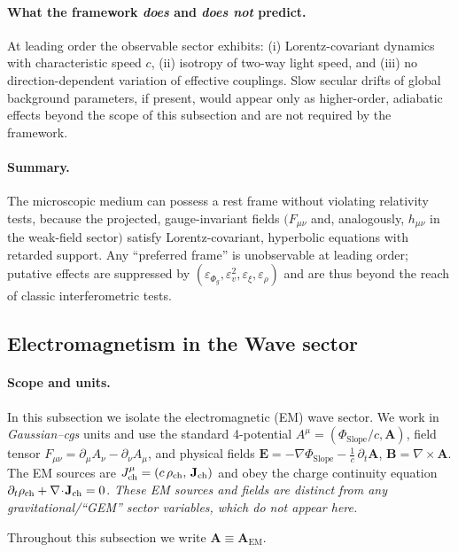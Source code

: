 \paragraph{What the framework \emph{does} and \emph{does not} predict.}
At leading order the observable sector exhibits: (i) Lorentz-covariant dynamics with characteristic speed $c$, (ii) isotropy of two-way light speed, and (iii) no direction-dependent variation of effective couplings. Slow secular drifts of global background parameters, if present, would appear only as higher-order, adiabatic effects beyond the scope of this subsection and are not required by the framework.

\paragraph{Summary.}
The microscopic medium can possess a rest frame without violating relativity tests, because the projected, gauge-invariant fields $(F_{\mu\nu}$ and, analogously, $h_{\mu\nu}$ in the weak-field sector$)$ satisfy Lorentz-covariant, hyperbolic equations with retarded support. Any ``preferred frame'' is unobservable at leading order; putative effects are suppressed by $(\varepsilon_{\Phi_g},\varepsilon_v^2,\varepsilon_\xi,\varepsilon_\rho)$ and are thus beyond the reach of classic interferometric tests.

\subsection{Electromagnetism in the Wave sector}
\label{subsec:em_wave}

\paragraph{Scope and units.}
In this subsection we isolate the electromagnetic (EM) wave sector. We work in \emph{Gaussian--cgs} units and use the standard 4-potential
\(A^\mu=(\Phi_{\text{Slope}}/c,\mathbf A)\), field tensor \(F_{\mu\nu}=\partial_\mu A_\nu-\partial_\nu A_\mu\),
and physical fields \(\mathbf E=-\nabla\Phi_{\text{Slope}}-\tfrac1c\,\partial_t\mathbf A\), \(\mathbf B=\nabla\times\mathbf A\).
The EM sources are \(J^\mu_{\rm ch}=(c\,\rho_{\rm ch},\,\mathbf J_{\rm ch})\) and obey the
charge continuity equation \(\partial_t\rho_{\rm ch}+\nabla\!\cdot\!\mathbf J_{\rm ch}=0\).
\emph{These EM sources and fields are distinct from any gravitational/``GEM'' sector variables, which do not appear here.}

Throughout this subsection we write $\mathbf A \equiv \mathbf A_{\text{EM}}$.

